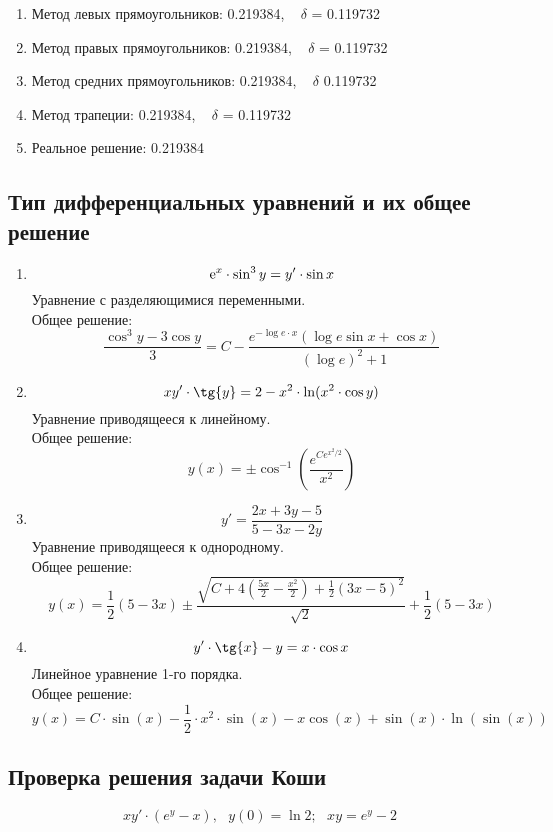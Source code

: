 \documentclass[14pt, titlepage, fleqn]{extarticle}
\begin{document}
\begin{enumerate}
	\item Метод левых прямоугольников:  0.219384, ~ $\delta$ = 0.119732\\

	\item Метод правых прямоугольников: 0.219384, ~ $\delta$ = 0.119732\\

	\item Метод средних прямоугольников: 0.219384, ~ $\delta$ 0.119732\\

	\item Метод трапеции: 0.219384, ~ $\delta$ = 0.119732\\

	\item Реальное решение: 0.219384
\end{enumerate}

\newpage
	\subsection*{Тип дифференциальных уравнений и их общее решение}

\begin{enumerate}

	\item  \[ {\rm e}^{x} \cdot \sin^{3}{y} = y'\cdot \sin{x}\] 
	Уравнение с разделяющимися переменными.\\	
	Общее решение: $${\frac{\cos^3{y} - 3 \cos{y}}{3} = C - \frac{e^{-\log{e \cdot x}}(\log{e} \sin{x} + \cos{x})}{(\log{e})^2 + 1}}$$

	\item \[xy' \cdot \tg{y} = 2 - x^2 \cdot \ln(x^2 \cdot \cos{y}) \]
	Уравнение приводящееся к линейному.\\
        Общее решение: $${y(x) = \pm \cos^{-1}{\left( \frac{e^{Ce^{x^2/2}}}{x^2} \right)}}$$

	\item \[y' = \frac{2x + 3y - 5}{5 - 3x - 2y}\] 
	Уравнение приводящееся к однородному.\\
	Общее решение: $${y(x)= \frac{1}{2}(5 - 3x) \pm \frac{\sqrt{C + 4 (\frac {5x}{2} - \frac{x^2}{2}) + \frac{1}{2}(3x-5)^2}}{\sqrt{2}} + \frac{1}{2}(5 - 3x)}$$
	
	\item \[y' \cdot \tg{x} - y = x \cdot \cos{x}\]
	Линейное уравнение 1-го порядка.\\
	Общее решение: $${y(x) = C \cdot \sin(x) - \frac{1}{2} \cdot x^2 \cdot \sin(x) - x\cos(x) + \sin(x) \cdot \ln(\sin(x))}$$

\end{enumerate}

	\newpage
	\subsection*{Проверка решения задачи Коши}
		\[xy' \cdot (e^{y} - x), ~~~y(0) = \ln{2}; ~~~xy = e^y-2\]
		
\end{document}
